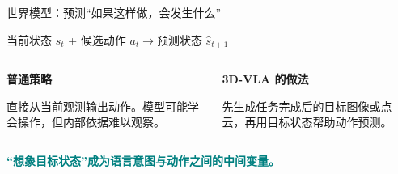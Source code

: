 \documentclass[aspectratio=169,11pt]{ctexbeamer}
\newcommand{\tealbold}[1]{\textcolor{Teal}{\textbf{#1}}}
\newcommand{\insertframesource}{}
\newcommand{\setsource}[1]{\gdef\insertframesource{#1}}
\begin{document}
\setsource{Refs.: [1] H. Zhen \emph{et al.}, \emph{Proc. ICML}, 2024. [2] D. Ha and J. Schmidhuber, ``World Models,'' arXiv:1803.10122, 2018.}
\begin{frame}{世界模型：预测“如果这样做，会发生什么”}
\vspace{0.12cm}
\begin{center}{\fontsize{20}{25}\selectfont 当前状态 $s_t$ + 候选动作 $a_t$\quad$\longrightarrow$\quad 预测状态 $\hat{s}_{t+1}$}\end{center}
\vspace{0.42cm}
\begin{columns}[T,onlytextwidth]
\begin{column}{0.45\textwidth}\textbf{普通策略}\par 直接从当前观测输出动作。模型可能学会操作，但内部依据难以观察。\end{column}
\begin{column}{0.45\textwidth}\textbf{3D-VLA 的做法}\par 先生成任务完成后的目标图像或点云，再用目标状态帮助动作预测。\end{column}
\end{columns}
\vspace{0.42cm}
\begin{center}\large\tealbold{“想象目标状态”成为语言意图与动作之间的中间变量。}\end{center}
\end{frame}
\end{document}
